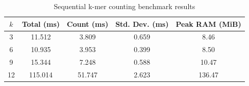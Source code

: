 \begin{table}[H]
    \centering
    \caption{Sequential k-mer counting benchmark results}
    \begin{tabular}{ccccc}
        \toprule
        $k$ & Total (ms) & Count (ms) & Std. Dev. (ms) & Peak RAM (MiB) \\
        \midrule
        3 & 11.512 & 3.809 & 0.659 & 8.46 \\
        6 & 10.935 & 3.953 & 0.399 & 8.50 \\
        9 & 15.344 & 7.248 & 0.588 & 10.47 \\
        12 & 115.014 & 51.747 & 2.623 & 136.47 \\
        \bottomrule
    \end{tabular}
    \label{tab:sequential_results}
\end{table}